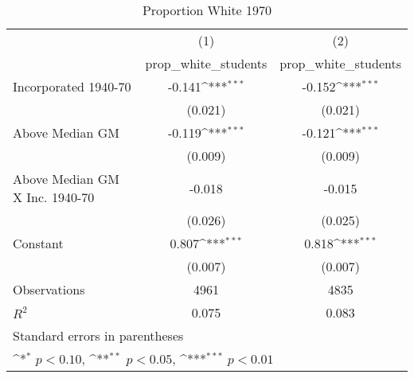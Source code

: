 \begin{table}[htbp]\centering
\def\sym#1{\ifmmode^{#1}\else\(^{#1}\)\fi}
\caption{Proportion White 1970}
\begin{tabular}{l*{2}{c}}
\hline\hline
                    &\multicolumn{1}{c}{(1)}&\multicolumn{1}{c}{(2)}\\
                    &\multicolumn{1}{c}{prop\_white\_students}&\multicolumn{1}{c}{prop\_white\_students}\\
\hline
Incorporated 1940-70&      -0.141\sym{***}&      -0.152\sym{***}\\
                    &     (0.021)         &     (0.021)         \\
[1em]
Above Median GM     &      -0.119\sym{***}&      -0.121\sym{***}\\
                    &     (0.009)         &     (0.009)         \\
[1em]
Above Median GM X Inc. 1940-70&      -0.018         &      -0.015         \\
                    &     (0.026)         &     (0.025)         \\
[1em]
Constant            &       0.807\sym{***}&       0.818\sym{***}\\
                    &     (0.007)         &     (0.007)         \\
\hline
Observations        &        4961         &        4835         \\
\(R^{2}\)           &       0.075         &       0.083         \\
\hline\hline
\multicolumn{3}{l}{\footnotesize Standard errors in parentheses}\\
\multicolumn{3}{l}{\footnotesize \sym{*} \(p<0.10\), \sym{**} \(p<0.05\), \sym{***} \(p<0.01\)}\\
\end{tabular}
\end{table}
